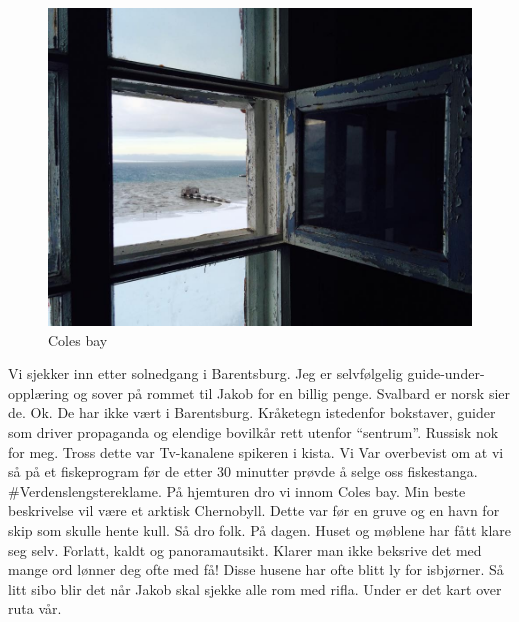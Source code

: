 \begin{figure}[!h]
	\centering
	\includegraphics[width=\textwidth]{Colesbay}
	\caption*{Coles bay}
\label{fig:tilbarentsburg}
\end{figure}

Vi sjekker inn etter solnedgang i Barentsburg. Jeg er selvfølgelig
guide-under-opplæring
og sover på rommet til Jakob for en billig penge. Svalbard er norsk
sier de. Ok. De har ikke vært i Barentsburg. Kråketegn istedenfor
bokstaver, guider som driver
propaganda og elendige bovilkår rett utenfor ``sentrum''. Russisk nok for meg. Tross dette var Tv-kanalene spikeren
i kista. Vi Var overbevist om at
vi så på et fiskeprogram før de etter 30 minutter prøvde å selge oss
fiskestanga. \#Verdenslengstereklame. På hjemturen dro vi innom Coles
bay. Min beste beskrivelse vil være et arktisk
Chernobyll. Dette var før en gruve og en havn for skip som skulle
 hente kull. Så dro folk. På dagen. Huset og møblene har
fått klare seg selv. Forlatt, kaldt og panoramautsikt. Klarer man ikke
beksrive det med mange ord lønner deg ofte med få! Disse husene har
ofte blitt ly for isbjørner. Så litt sibo blir det når Jakob skal
sjekke alle rom med rifla. Under er det kart over ruta vår. 

